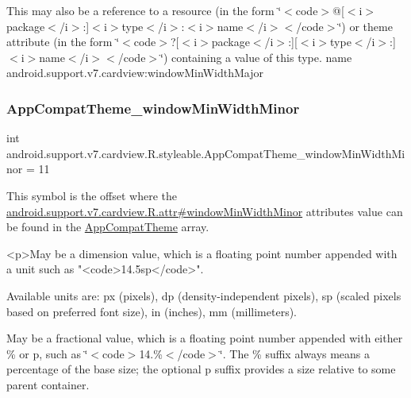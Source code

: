 This may also be a reference to a resource (in the form \char`\"{}$<$code$>$@\mbox{[}$<$i$>$package$<$/i$>$\+:\mbox{]}$<$i$>$type$<$/i$>$\+:$<$i$>$name$<$/i$>$$<$/code$>$\char`\"{}) or theme attribute (in the form \char`\"{}$<$code$>$?\mbox{[}$<$i$>$package$<$/i$>$\+:\mbox{]}\mbox{[}$<$i$>$type$<$/i$>$\+:\mbox{]}$<$i$>$name$<$/i$>$$<$/code$>$\char`\"{}) containing a value of this type.  name android.\+support.\+v7.\+cardview\+:window\+Min\+Width\+Major \mbox{\label{classandroid_1_1support_1_1v7_1_1cardview_1_1R_1_1styleable_aa1098644aec6afc914db566e8faa7357}} 
\subsubsection{\texorpdfstring{App\+Compat\+Theme\+\_\+window\+Min\+Width\+Minor}{AppCompatTheme\_windowMinWidthMinor}}
{\footnotesize\ttfamily int android.\+support.\+v7.\+cardview.\+R.\+styleable.\+App\+Compat\+Theme\+\_\+window\+Min\+Width\+Minor = 11\hspace{0.3cm}{\ttfamily [static]}}

This symbol is the offset where the \hyperlink{classandroid_1_1support_1_1v7_1_1cardview_1_1R_1_1attr_a85ca0290c40bde370780acb11b48134e}{android.\+support.\+v7.\+cardview.\+R.\+attr\#window\+Min\+Width\+Minor} attribute\textquotesingle{}s value can be found in the \hyperlink{classandroid_1_1support_1_1v7_1_1cardview_1_1R_1_1styleable_a52e6f69f954ecc2622d72c0b4d298938}{App\+Compat\+Theme} array.

\begin{DoxyVerb}      <p>May be a dimension value, which is a floating point number appended with a unit such as "<code>14.5sp</code>".
\end{DoxyVerb}
 Available units are\+: px (pixels), dp (density-\/independent pixels), sp (scaled pixels based on preferred font size), in (inches), mm (millimeters). 

May be a fractional value, which is a floating point number appended with either \% or p, such as \char`\"{}$<$code$>$14.\%$<$/code$>$\char`\"{}. The \% suffix always means a percentage of the base size; the optional p suffix provides a size relative to some parent container. 


